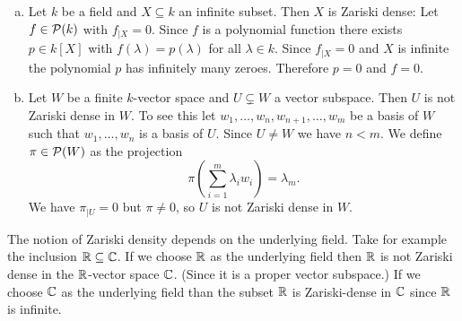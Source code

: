 \begin{expls}\leavevmode
 \begin{enumerate}[a)]
  \item 
  Let $k$ be a field and $X \subseteq k$ an infinite subset. Then $X$ is Zariski dense: Let $f \in \mathcal{P}(k)$ with $f_{|X} = 0$. Since $f$ is a polynomial function there exists $p \in k[X]$ with $f(\lambda) = p(\lambda)$ for all $\lambda \in k$. Since $f_{|X} = 0$ and $X$ is infinite the polynomial $p$ has infinitely many zeroes. Therefore $p = 0$ and $f = 0$.
  \item
  Let $W$ be a finite $k$-vector space and $U \subsetneq W$ a vector subspace. Then $U$ is not Zariski dense in $W$. To see this let $w_1, \dotsc, w_n, w_{n+1}, \dotsc, w_m$ be a basis of $W$ such that $w_1, \dotsc, w_n$ is a basis of $U$. Since $U \neq W$ we have $n < m$. We define $\pi \in \mathcal{P}(W)$ as the projection
  \[
   \pi\left(\sum_{i=1}^m \lambda_i w_i\right) = \lambda_m.
  \]
  We have $\pi_{|U} = 0$ but $\pi \neq 0$, so $U$ is not Zariski dense in $W$.
 \end{enumerate}
\end{expls}


\begin{warn}
 The notion of Zariski density depends on the underlying field. Take for example the inclusion $\mathbb{R} \subseteq \mathbb{C}$. If we choose $\mathbb{R}$ as the underlying field then $\mathbb{R}$ is not Zariski dense in the $\mathbb{R}$-vector space $\mathbb{C}$. (Since it is a proper vector subspace.) If we choose $\mathbb{C}$ as the underlying field than the subset $\mathbb{R}$ is Zariski-dense in $\mathbb{C}$ since $\mathbb{R}$ is infinite.
\end{warn}



